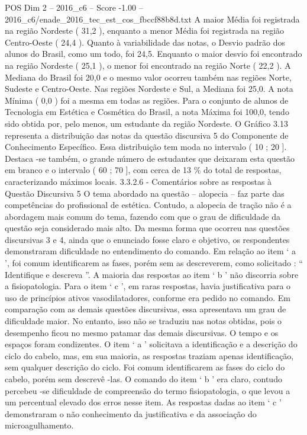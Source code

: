 \begin{textsample}{POS Dim 2 – 2016\_c6 – Score -1.00 – 2016\_c6/enade\_2016\_tec\_est\_cos\_fbccf88b8d.txt}
A maior Média foi registrada na região Nordeste ( 31,2 ), enquanto a menor Média foi registrada na região Centro-Oeste ( 24,4 ).
Quanto à variabilidade das notas, o Desvio padrão dos alunos do Brasil, como um todo, foi 24,5.
Enquanto o maior desvio foi encontrado na região Nordeste ( 25,1 ), o menor foi encontrado na região Norte ( 22,2 ).
A Mediana do Brasil foi 20,0 e o mesmo valor ocorreu também nas regiões Norte, Sudeste e Centro-Oeste.
Nas regiões Nordeste e Sul, a Mediana foi 25,0.
A nota Mínima ( 0,0 ) foi a mesma em todas as regiões.
Para o conjunto de alunos de Tecnologia em Estética e Cosmética do Brasil, a nota Máxima foi 100,0, tendo sido obtida por, pelo menos, um estudante da região Nordeste.
O Gráfico 3.13 representa a distribuição das notas da questão discursiva 5 do Componente de Conhecimento Específico.
Essa distribuição tem moda no intervalo ( 10 ; 20 ].
Destaca -se também, o grande número de estudantes que deixaram esta questão em branco e o intervalo ( 60 ; 70 ], com cerca de 13 \% do total de respostas, caracterizando máximos locais. 3.3.2.6 - Comentários sobre as respostas à Questão Discursiva 5 O tema abordado na questão – alopecia – faz parte das competências do profissional de estética.
Contudo, a alopecia de tração não é a abordagem mais comum do tema, fazendo com que o grau de dificuldade da questão seja considerado mais alto.
Da mesma forma que ocorreu nas questões discursivas 3 e 4, ainda que o enunciado fosse claro e objetivo, os respondentes demonstraram dificuldade no entendimento do comando.
Em relação ao item ‘ a ’, foi comum identificarem as fases, porém sem as descreverem, como solicitado : “ Identifique e descreva ”.
A maioria das respostas ao item ‘ b ’ não discorria sobre a fisiopatologia.
Para o item ‘ c ’, em raras respostas, havia justificativa para o uso de princípios ativos vasodilatadores, conforme era pedido no comando.
Em comparação com as demais questões discursivas, essa apresentava um grau de dificuldade maior.
No entanto, isso não se traduziu nas notas obtidas, pois o desempenho ficou no mesmo patamar das demais discursivas.
O tempo e os espaços foram condizentes.
O item ‘ a ’ solicitava a identificação e a descrição do ciclo do cabelo, mas, em sua maioria, as respostas traziam apenas identificação, sem qualquer descrição do ciclo.
Foi comum identificarem as fases do ciclo do cabelo, porém sem descrevê -las.
O comando do item ‘ b ’ era claro, contudo percebeu -se dificuldade de compreensão do termo fisiopatologia, o que levou a um percentual elevado dos erros nesse item.
As respostas dadas ao item ‘ c ’ demonstraram o não conhecimento da justificativa e da associação do microagulhamento.

\end{textsample}
